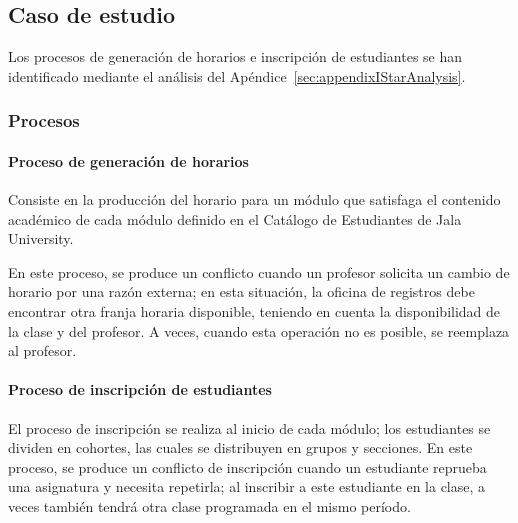 \subsection{Caso de estudio}
Los procesos de generación de horarios e inscripción de estudiantes se han identificado mediante el análisis del Apéndice~\ref{sec:appendixIStarAnalysis}.

\subsubsection{Procesos}
\paragraph{Proceso de generación de horarios}
Consiste en la producción del horario para un módulo que satisfaga el contenido académico de cada módulo definido en el Catálogo de Estudiantes de Jala University.

En este proceso, se produce un conflicto cuando un profesor solicita un cambio de horario por una razón externa; en esta situación, la oficina de registros debe encontrar otra franja horaria disponible, teniendo en cuenta la disponibilidad de la clase y del profesor.
A veces, cuando esta operación no es posible, se reemplaza al profesor.

\paragraph{Proceso de inscripción de estudiantes}
El proceso de inscripción se realiza al inicio de cada módulo; los estudiantes se dividen en cohortes, las cuales se distribuyen en grupos y secciones.
En este proceso, se produce un conflicto de inscripción cuando un estudiante reprueba una asignatura y necesita repetirla; al inscribir a este estudiante en la clase, a veces también tendrá otra clase programada en el mismo período.
